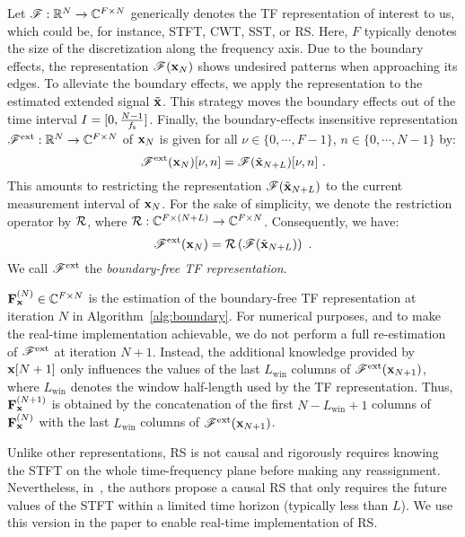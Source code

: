 Let ${\mathscr F}:{\mathbb R}^{N}\to\mathbb C^{F\times N}$ generically denotes the TF representation of interest to us, which could be, for instance, STFT, CWT, SST, or RS. Here, $F$ typically denotes the size of the discretization along the frequency axis. Due to the boundary effects, the representation ${\mathscr F}({\mathbf x}_N)$ shows undesired patterns when approaching its edges. To alleviate the boundary effects, we apply the representation to the estimated extended signal $\tilde{{\mathbf x}}$. This strategy moves the boundary effects out of the time interval $I=[0, \frac{N-1}{f_{\mathsf s}}]$. Finally, the boundary-effects insensitive representation ${\mathscr F}^{\mathrm{ext}}:{\mathbb R}^{N}\to\mathbb C^{F\times N}$ of ${\mathbf x}_N$ is given for all $\nu\in\{0,\cdots,F-1\}$, $n\in\{0,\cdots,N-1\}$ by:
\begin{equation}
\ccF^{\mathrm{ext}}(\bx_N)[\nu,n] = \ccF(\tilde \bx_{N+L})[\nu,n]\ .
\label{eq:restriction}
\end{equation}
This amounts to restricting the representation ${\mathscr F}(\tilde {{\mathbf x}}_{N+L})$ to the current measurement interval of ${\mathbf x}_N$. For the sake of simplicity, we denote the restriction operator by ${\mathcal R}$, where ${\mathcal R}:\mathbb C^{F\times (N+L)}\to\mathbb C^{F\times N}$. Consequently, we have:
\begin{equation}
\ccF^{\mathrm{ext}}(\bx_N) = \cR\left( \ccF(\tilde \bx_{N+L}) \right) \ .
\label{eq:bound.free.TFR}
\end{equation}
We call ${\mathscr F}^{\mathrm{ext}}$ the {\em boundary-free TF representation}.

${\mathbf F}_{\mathbf x}^{(N)}\in\mathbb C^{F\times N}$ is the estimation of the boundary-free TF representation at iteration $N$ in Algorithm~\ref{alg:boundary}. For numerical purposes, and to make the real-time implementation achievable, we do not perform a full re-estimation of ${\mathscr F}^{\mathrm{ext}}$ at iteration $N+1$. Instead, the additional knowledge provided by ${\mathbf x}[N+1]$ only influences the values of the last $L_{\mathrm{win}}$ columns of ${\mathscr F}^{\mathrm{ext}}({\mathbf x}_{N+1})$, where $L_{\mathrm{win}}$ denotes the window half-length used by the TF representation. Thus, ${\mathbf F}_{\mathbf x}^{(N+1)}$ is obtained by the concatenation of the first $N-L_{\mathrm{win}}+ 1$ columns of ${\mathbf F}_{\mathbf x}^{(N)}$ with the last $L_{\mathrm{win}}$ columns of ${\mathscr F}^{\mathrm{ext}}({\mathbf x}_{N+1})$.

\begin{remark}
Unlike other representations, RS is not causal and rigorously requires knowing the STFT on the whole time-frequency plane before making any reassignment. Nevertheless, in~\cite{Lin17conceft}, the authors propose a causal RS that only requires the future values of the STFT within a limited time horizon (typically less than $L$). We use this version in the paper to enable real-time implementation of RS.
\end{remark}
